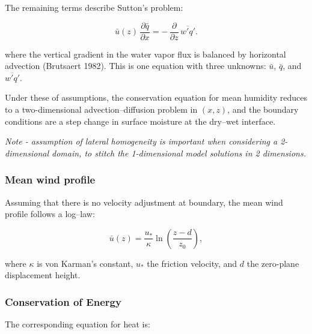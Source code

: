 \documentclass{article}
\begin{document}


    The remaining terms describe Sutton's problem: 

    \begin{equation}
    \bar u (z)\,\frac{\partial \bar q}{\partial x}
    = -\,\frac{\partial}{\partial z}\,\overline{w' q'} .
    \end{equation}

    where the vertical gradient in the water vapor flux is balanced by horizontal advection (Brutsaert 1982). This is one equation with three unknowns: $\bar u$, $\bar q$, and $\overline{w' q'}$. 

    
    Under these of assumptions, the conservation equation for mean humidity reduces to a two-dimensional advection--diffusion problem in $(x,z)$,
    and the boundary conditions are a step change in surface moisture at the dry--wet interface.

    \textit{Note - assumption of lateral homogeneity is important when considering a 2-dimensional domain, to stitch the 1-dimensional model solutions in 2 dimensions. }

    \subsubsection*{Mean wind profile}

    Assuming that there is no velocity adjustment at boundary,  the mean wind profile follows a log–law: 

    \begin{equation}
    \bar u(z) = \frac{u_*}{\kappa} \ln\!\left(\frac{z-d}{z_0}\right),    
    \end{equation}

    where $\kappa$ is von Karman's constant, 
    $u_*$ the friction velocity, and 
    $d$ the zero-plane displacement height.


    \subsubsection*{Conservation of Energy}

    The corresponding equation for heat is: 
\end{document}
